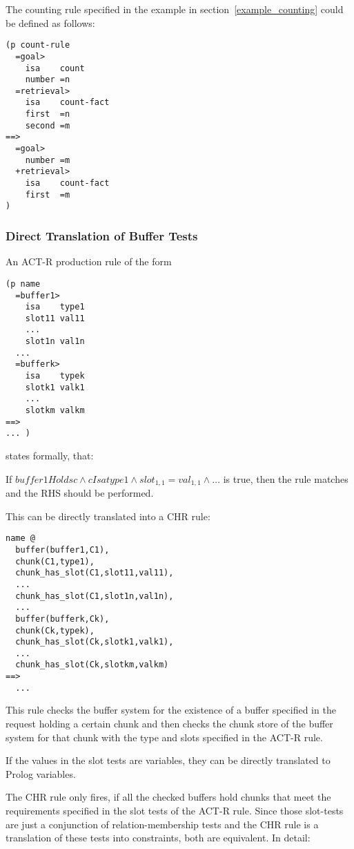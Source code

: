 \begin{example}
\label{ex:counting}
The counting rule specified in the example in section~\ref{example_counting} could be defined as follows:

\begin{lstlisting}
(p count-rule
  =goal> 
    isa    count
    number =n
  =retrieval>
    isa    count-fact
    first  =n
    second =m
==>
  =goal>
    number =m
  +retrieval>
    isa    count-fact
    first  =m
)
\end{lstlisting}


\end{example}

\subsubsection{Direct Translation of Buffer Tests}

An ACT-R production rule of the form

\begin{verbatim}
(p name
  =buffer1>
    isa    type1
    slot11 val11
    ...
    slot1n val1n
  ...
  =bufferk>
    isa    typek
    slotk1 valk1
    ...
    slotkm valkm
==>
... )
\end{verbatim}

states formally, that:

If $buffer1 Holds c \wedge c Isa type1 \wedge slot_{1,1}=val_{1,1} \wedge \dots$  is true, then the rule matches and the RHS should be performed.

This can be directly translated into a CHR rule:

\begin{verbatim}
name @
  buffer(buffer1,C1),
  chunk(C1,type1),
  chunk_has_slot(C1,slot11,val11),
  ...
  chunk_has_slot(C1,slot1n,val1n),
  ...
  buffer(bufferk,Ck),
  chunk(Ck,typek),
  chunk_has_slot(Ck,slotk1,valk1),
  ...
  chunk_has_slot(Ck,slotkm,valkm)
==>
  ...
\end{verbatim}

This rule checks the buffer system for the existence of a buffer specified in the request holding a certain chunk and then checks the chunk store of the buffer system for that chunk with the type and slots specified in the ACT-R rule.

If the values in the slot tests are variables, they can be directly translated to Prolog variables.

The CHR rule only fires, if all the checked buffers hold chunks that meet the requirements specified in the slot tests of the ACT-R rule. Since those slot-tests are just a conjunction of relation-membership tests and the CHR rule is a translation of these tests into constraints, both are equivalent. In detail: 

